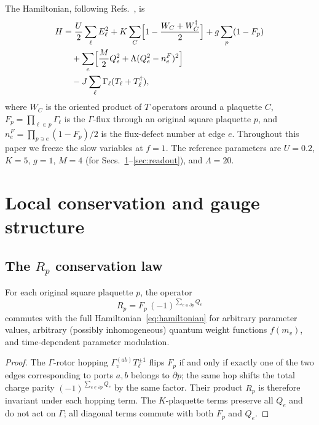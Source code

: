 \documentclass[aps,prb,twocolumn,superscriptaddress,showpacs]{revtex4-2}
\begin{document}
The Hamiltonian, following Refs.~\cite{levin2003,levin2006}, is
\begin{align}
H &= \frac{U}{2}\sum_\ell E_\ell^2
+ K\sum_C\Bigl[1-\frac{W_C+W_C^\dagger}{2}\Bigr]
+ g\sum_p(1-F_p) \nonumber\\
&\quad + \sum_e\Bigl[\frac{M}{2}Q_e^2+\Lambda(Q_e^2-n_e^F)^2\Bigr]
\nonumber\\
&\quad - J\sum_\ell \Gamma_\ell(T_\ell+T_\ell^\dagger),
\label{eq:hamiltonian}
\end{align}
where $W_C$ is the oriented product of $T$ operators around a plaquette
$C$, $F_p=\prod_{\ell\in p}\Gamma_\ell$ is the $\Gamma$-flux through
an original square plaquette $p$, and $n_e^F=\prod_{p\ni e}(1-F_p)/2$
is the flux-defect number at edge $e$. Throughout this paper we freeze
the slow variables at $f=1$. The reference parameters are
$U=0.2$, $K=5$, $g=1$, $M=4$ (for Secs.~\ref{sec:conservation}--\ref{sec:readout}), and $\Lambda=20$.

\section{Local conservation and gauge structure}
\label{sec:conservation}

\subsection{The $R_p$ conservation law}

\begin{theorem}
For each original square plaquette $p$, the operator
\begin{equation}
R_p = F_p\,(-1)^{\sum_{e\in\partial p}Q_e}
\label{eq:Rp}
\end{equation}
commutes with the full Hamiltonian~\eqref{eq:hamiltonian} for arbitrary
parameter values, arbitrary (possibly inhomogeneous) quantum weight
functions $f(m_v)$, and time-dependent parameter modulation.
\end{theorem}

\begin{proof}
The $\Gamma$-rotor hopping $\Gamma_v^{(ab)}T_\ell^{\pm 1}$ flips
$F_p$ if and only if exactly one of the two edges corresponding to
ports $a,b$ belongs to $\partial p$; the same hop shifts the total
charge parity $(-1)^{\sum_{e\in\partial p}Q_e}$ by the same factor.
Their product $R_p$ is therefore invariant under each hopping term.
The $K$-plaquette terms preserve all $Q_e$ and do not act on $\Gamma$;
all diagonal terms commute with both $F_p$ and $Q_e$.
\end{proof}
\end{document}
